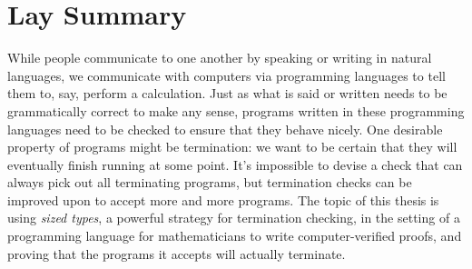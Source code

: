 \chapter{Lay Summary}

While people communicate to one another by speaking or writing in natural languages,
we communicate with computers via programming languages to tell them to, say, perform a calculation.
Just as what is said or written needs to be grammatically correct to make any sense,
programs written in these programming languages need to be checked to ensure that they behave nicely.
One desirable property of programs might be termination:
we want to be certain that they will eventually finish running at some point.
It's impossible to devise a check that can always pick out all terminating programs,
but termination checks can be improved upon to accept more and more programs.
The topic of this thesis is using \emph{sized types}, a powerful strategy for termination checking,
in the setting of a programming language for mathematicians to write computer-verified proofs,
and proving that the programs it accepts will actually terminate.